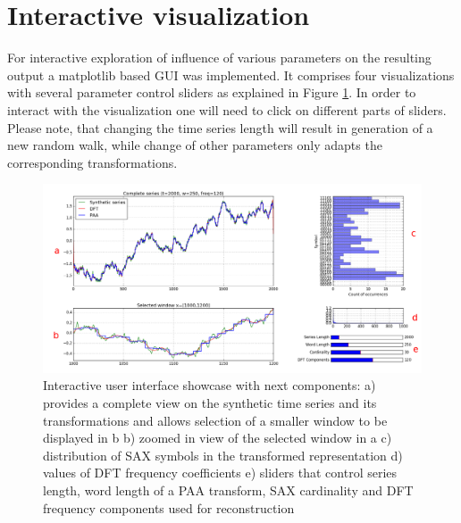 \documentclass{article}
\begin{document}
\section{Interactive visualization}
For interactive exploration of influence of various parameters on the resulting output a matplotlib based GUI was implemented. It comprises four visualizations with several parameter control sliders as explained in Figure \ref{fig:2}. In order to interact with the visualization one will need to click on different parts of sliders. Please note, that changing the time series length will result in generation of a new random walk, while change of other parameters only adapts the corresponding transformations.
\begin{figure}[h!]
	\begin{center}
		\includegraphics[width=\textwidth]{images/vis-labeled.png}
		\caption{Interactive user interface showcase with next components: a) provides a complete view on the synthetic time series and its transformations and allows selection of a smaller window to be displayed in b b) zoomed in view of the selected window in a c) distribution of SAX symbols in the transformed representation d) values of DFT frequency coefficients e) sliders that control series length, word length of a PAA transform, SAX cardinality and DFT frequency components used for reconstruction}
		\label{fig:2}
	\end{center}
\end{figure}
\end{document}
